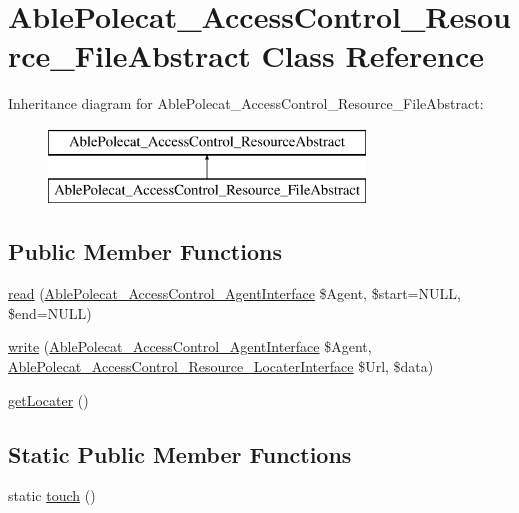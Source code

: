 \hypertarget{class_able_polecat___access_control___resource___file_abstract}{}\section{Able\+Polecat\+\_\+\+Access\+Control\+\_\+\+Resource\+\_\+\+File\+Abstract Class Reference}
\label{class_able_polecat___access_control___resource___file_abstract}
Inheritance diagram for Able\+Polecat\+\_\+\+Access\+Control\+\_\+\+Resource\+\_\+\+File\+Abstract\+:\begin{figure}[H]
\begin{center}
\leavevmode
\includegraphics[height=2.000000cm]{class_able_polecat___access_control___resource___file_abstract}
\end{center}
\end{figure}
\subsection*{Public Member Functions}
\begin{DoxyCompactItemize}
\item 
\hyperlink{class_able_polecat___access_control___resource___file_abstract_a4f33a50fb174591e6426c4abac73dc95}{read} (\hyperlink{interface_able_polecat___access_control___agent_interface}{Able\+Polecat\+\_\+\+Access\+Control\+\_\+\+Agent\+Interface} \$Agent, \$start=N\+U\+L\+L, \$end=N\+U\+L\+L)
\item 
\hyperlink{class_able_polecat___access_control___resource___file_abstract_a6a5f9c496c9997a3240a972fa71df542}{write} (\hyperlink{interface_able_polecat___access_control___agent_interface}{Able\+Polecat\+\_\+\+Access\+Control\+\_\+\+Agent\+Interface} \$Agent, \hyperlink{interface_able_polecat___access_control___resource___locater_interface}{Able\+Polecat\+\_\+\+Access\+Control\+\_\+\+Resource\+\_\+\+Locater\+Interface} \$Url, \$data)
\item 
\hyperlink{class_able_polecat___access_control___resource___file_abstract_a66e49cc03d1511ec4c0290ffaa688079}{get\+Locater} ()
\end{DoxyCompactItemize}
\subsection*{Static Public Member Functions}
\begin{DoxyCompactItemize}
\item 
static \hyperlink{class_able_polecat___access_control___resource___file_abstract_a4b8d4fa822f808c16e9c3743d69f086f}{touch} ()
\end{DoxyCompactItemize}
